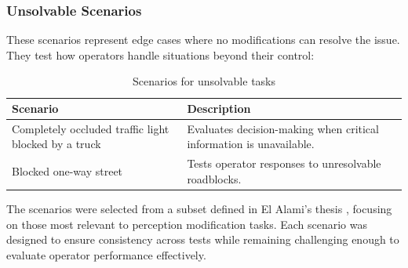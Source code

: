 \subsubsection{Unsolvable Scenarios}
These scenarios represent edge cases where no modifications can resolve the issue. They test how operators handle situations beyond their control:

\begin{table}[h!]
    \centering
    \begin{tabular}{|p{6cm}|p{7.8cm}|}
    \hline
    \textbf{Scenario} & \textbf{Description} \\
    \hline
    Completely occluded traffic light blocked by a truck & Evaluates decision-making when critical information is unavailable. \\ \hline
    Blocked one-way street & Tests operator responses to unresolvable roadblocks. \\ \hline
    \end{tabular}
    \caption{Scenarios for unsolvable tasks}
    \label{table:scenariosunsolvable}
    \end{table}

The scenarios were selected from a subset defined in El Alami's thesis \cite{yassinethesis}, focusing on those most relevant to perception modification tasks. Each scenario was designed to ensure consistency across tests while remaining challenging enough to evaluate operator performance effectively.

